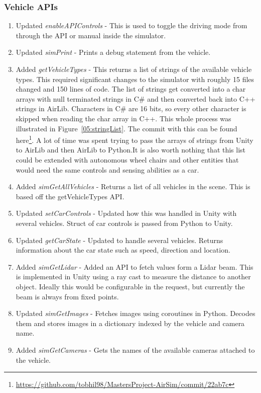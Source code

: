 \subsubsection{Vehicle APIs}
\begin{enumerate}
    \item Updated \emph{enableAPIControls} - This is used to toggle the driving mode from through the API or manual inside the simulator.
    \item Updated \emph{simPrint} - Prints a debug statement from the vehicle.
    \item Added \emph{getVehicleTypes} - This returns a list of strings of the available vehicle types. This required significant changes to the simulator with roughly 15 files changed and 150 lines of code. The list of strings get converted into a char arrays with null terminated strings in C\# and then converted back into C++ strings in AirLib. Characters in C# are 16 bits, so every other character is skipped when reading the char array in C++.  This whole process was illustrated in Figure~\ref{05:stringList}. The commit with this can be found here\footnote{\url{https://github.com/tobhil98/MastersProject-AirSim/commit/22ab7c}}. A lot of time was spent trying to pass the arrays of strings from Unity to AirLib and then AirLib to Python.It is also worth nothing that this list could be extended with autonomous wheel chairs and other entities that would need the same controls and sensing abilities as a car. 
    \item Added \emph{simGetAllVehicles} - Returns a list of all vehicles in the scene. This is based off the getVehicleTypes API. 
    \item Updated \emph{setCarControls} - Updated how this was handled in Unity with several vehicles. Struct of car controls is passed from Python to Unity. 
    \item Updated \emph{getCarState} - Updated to handle several vehicles. Returns information about the car state such as speed, direction and location. 
    \item Added \emph{simGetLidar} - Added an API to fetch values form a Lidar beam. This is implemented in Unity using a ray cast to measure the distance to another object. Ideally this would be configurable in the request, but currently the beam is always from fixed points. 
    \item Updated \emph{simGetImages} - Fetches images using coroutines in Python. Decodes them and stores images in a dictionary indexed by the vehicle and camera name.
    \item Added \emph{simGetCameras} - Gets the names of the available cameras attached to the vehicle. 
\end{enumerate}

